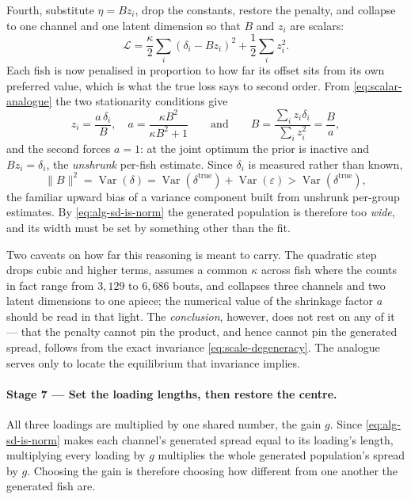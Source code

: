 Fourth, substitute $\eta=Bz_i$, drop the constants, restore the penalty, and
collapse to one channel and one latent dimension so that $B$ and $z_i$ are
scalars:
\begin{equation}
\mathcal{L}=\frac{\kappa}{2}\sum_i(\delta_i-Bz_i)^2+\frac12\sum_i z_i^2 .
\label{eq:scalar-analogue}
\end{equation}
Each fish is now penalised in proportion to how far its offset sits from its own
preferred value, which is what the true loss says to second order. From
\eqref{eq:scalar-analogue} the two stationarity conditions give
\[
z_i=\frac{a\,\delta_i}{B},\quad a=\frac{\kappa B^2}{\kappa B^2+1}
\qquad\text{and}\qquad
B=\frac{\sum_i z_i\delta_i}{\sum_i z_i^2}=\frac{B}{a},
\]
and the second forces $a=1$: at the joint optimum the prior is inactive and
$Bz_i=\delta_i$, the \emph{unshrunk} per-fish estimate. Since $\delta_i$ is
measured rather than known,
\begin{equation}
\lVert B\rVert^2=\operatorname{Var}(\delta)
=\operatorname{Var}(\delta^{\text{true}})+\operatorname{Var}(\varepsilon)
>\operatorname{Var}(\delta^{\text{true}}),
\end{equation}
the familiar upward bias of a variance component built from unshrunk per-group
estimates. By \eqref{eq:alg-sd-is-norm} the generated population is therefore
too \emph{wide}, and its width must be set by something other than the fit.

Two caveats on how far this reasoning is meant to carry. The quadratic step
drops cubic and higher terms, assumes a common $\kappa$ across fish where the
counts in fact range from $3{,}129$ to $6{,}686$ bouts, and collapses three
channels and two latent dimensions to one apiece; the numerical value of the
shrinkage factor $a$ should be read in that light. The \emph{conclusion},
however, does not rest on any of it --- that the penalty cannot pin the product,
and hence cannot pin the generated spread, follows from the exact invariance
\eqref{eq:scale-degeneracy}. The analogue serves only to locate the equilibrium
that invariance implies.

\paragraph{Stage 7 --- Set the loading lengths, then restore the centre.}
All three loadings are multiplied by one shared number, the gain $g$. Since
\eqref{eq:alg-sd-is-norm} makes each channel's generated spread equal to its
loading's length, multiplying every loading by $g$ multiplies the whole
generated population's spread by $g$. Choosing the gain is therefore choosing
how different from one another the generated fish are.

